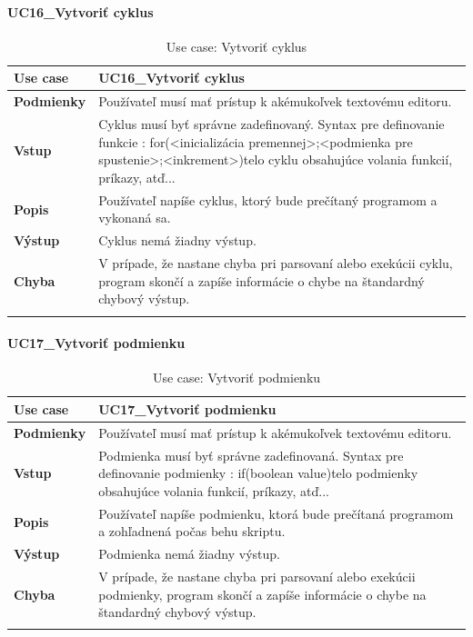 \paragraph{UC16\_Vytvoriť cyklus}
\begin{center}
	\begin{longtable}{|p{2.5cm}|p{12.2cm}|}
		
			\hline
			\textbf{Use case} & UC16\_Vytvoriť cyklus \\ 
			\hline
			\textbf{Podmienky} & Používateľ musí mať prístup k akémukoľvek textovému editoru.  \\ 
			\hline
			\textbf{Vstup} & Cyklus musí byť správne zadefinovaný. 
			Syntax pre definovanie funkcie : 
			\newline
			for(<inicializácia premennej>;<podmienka pre spustenie>;<inkrement>){telo cyklu obsahujúce volania funkcií, príkazy, atď..}. \\
			\hline

			\textbf{Popis} & Používateľ napíše cyklus, ktorý bude prečítaný programom a vykonaná sa.\\ 
			\hline
			\textbf{Výstup} & Cyklus nemá žiadny výstup.\\
			\hline
			\textbf{Chyba} & V prípade, že nastane chyba pri parsovaní alebo exekúcii cyklu, program skončí a zapíše informácie o chybe na štandardný chybový výstup.\\
			\hline
		\caption{Use case: Vytvoriť cyklus}
		\label{table:1}
		
	\end{longtable}
\end{center}
\paragraph{UC17\_Vytvoriť podmienku}
\begin{center}
	\begin{longtable}{|p{2.5cm}|p{12.2cm}|}
		
			\hline
			\textbf{Use case} & UC17\_Vytvoriť podmienku \\ 
			\hline
			\textbf{Podmienky} & Používateľ musí mať prístup k akémukoľvek textovému editoru.  \\ 
			\hline
			\textbf{Vstup} & Podmienka musí byť správne zadefinovaná. 
			Syntax pre definovanie podmienky : 
			\newline
			if(boolean value){telo podmienky obsahujúce volania funkcií, príkazy, atď..}. \\
			\hline
			\textbf{Popis} & Používateľ napíše podmienku, ktorá bude prečítaná programom a zohľadnená počas behu skriptu.\\ 
			\hline
			\textbf{Výstup} & Podmienka nemá žiadny výstup.\\
			\hline
			\textbf{Chyba} & V prípade, že nastane chyba pri parsovaní alebo exekúcii podmienky, program skončí a zapíše informácie o chybe na štandardný chybový výstup.\\
			\hline
		\caption{Use case: Vytvoriť podmienku}
		\label{table:1}
		
	\end{longtable}
\end{center}
\newpage
